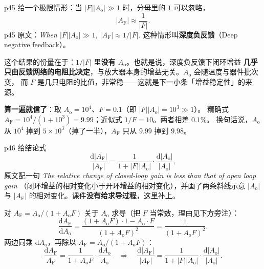 \documentclass[11pt]{ctexart}
\begin{document}
p45 给一个极限情形：当 $|F||A_{\mathrm{o}}|\gg1$ 时，分母里的 $1$ 可以忽略，
\[
|A_{\mathrm{F}}|\approx\frac{1}{|F|} .
\]
p45 原文：\textit{When $|F||A_{\mathrm{o}}|\gg1$, $|A_{\mathrm{F}}|\approx1/|F|$.}
这种情形叫\textbf{深度负反馈}（Deep negative feedback）。

这个结果的份量在于：$1/|F|$ 里\textbf{没有 $A_{\mathrm{o}}$}。也就是说，深度负反馈下闭环增益
\textbf{几乎只由反馈网络的电阻比决定}，与放大器本身的增益无关。$A_{\mathrm{o}}$ 会随温度与器件批次变，
而 $F$ 是几只电阻的比值，非常稳——这就是下一小条「增益稳定性」的来源。

\begin{cbox}
\textbf{算一遍就信了}：取 $A_{\mathrm{o}}=10^{4}$、$F=0.1$（即 $|F||A_{\mathrm{o}}|=10^{3}\gg1$）。
精确式 $A_{\mathrm{F}}=10^{4}/(1+10^{3})=9.99$；近似式 $1/F=10$。两者相差 $0.1\%$。
换句话说，$A_{\mathrm{o}}$ 从 $10^{4}$ 掉到 $5\times10^{3}$（掉了一半），$A_{\mathrm{F}}$ 只从 $9.99$ 掉到 $9.98$。
\end{cbox}


p46 给结论式
\[
\frac{\mathrm{d}|A_{\mathrm{F}}|}{|A_{\mathrm{F}}|}
=\frac{1}{1+|F||A_{\mathrm{o}}|}\cdot\frac{\mathrm{d}|A_{\mathrm{o}}|}{|A_{\mathrm{o}}|},
\]
原文配一句 \textit{The relative change of closed-loop gain is less than that of open loop gain}
（闭环增益的相对变化小于开环增益的相对变化），并画了两条斜线示意 $|A_{\mathrm{o}}|$ 与 $|A_{\mathrm{F}}|$
的相对变化。课件\textbf{没有给求导过程}，这里补上。

对 $A_{\mathrm{F}}=A_{\mathrm{o}}/(1+A_{\mathrm{o}}F)$ 关于 $A_{\mathrm{o}}$ 求导（把 $F$ 当常数，理由见下方旁注）：
\[
\frac{\mathrm{d}A_{\mathrm{F}}}{\mathrm{d}A_{\mathrm{o}}}
=\frac{(1+A_{\mathrm{o}}F)\cdot1-A_{\mathrm{o}}\cdot F}{(1+A_{\mathrm{o}}F)^{2}}
=\frac{1}{(1+A_{\mathrm{o}}F)^{2}} .
\]
两边同乘 $\mathrm{d}A_{\mathrm{o}}$，再除以 $A_{\mathrm{F}}=A_{\mathrm{o}}/(1+A_{\mathrm{o}}F)$：
\[
\frac{\mathrm{d}A_{\mathrm{F}}}{A_{\mathrm{F}}}
=\frac{1}{1+A_{\mathrm{o}}F}\cdot\frac{\mathrm{d}A_{\mathrm{o}}}{A_{\mathrm{o}}}
\quad\Longrightarrow\quad
\frac{\mathrm{d}|A_{\mathrm{F}}|}{|A_{\mathrm{F}}|}
=\frac{1}{1+|F||A_{\mathrm{o}}|}\cdot\frac{\mathrm{d}|A_{\mathrm{o}}|}{|A_{\mathrm{o}}|} .
\]

\end{document}
